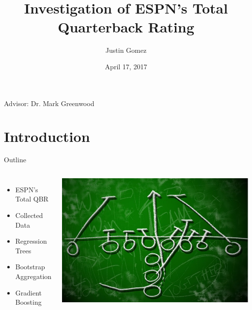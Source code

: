 \documentclass{beamer}
\title[ESPN's Total QBR]{Investigation of ESPN's Total Quarterback Rating}
\author{Justin Gomez}
\institute{Montana State University}
\date{April 17, 2017}
\begin{document}
	
	\begin{frame}
		\titlepage
		\centering
		\small
		Advisor: Dr. Mark Greenwood
	\end{frame}
	
	
	\section{Introduction}
	
	\begin{frame}{Outline}
		\begin{columns}
			\begin{itemize}
				\item ESPN's Total QBR
				\item Collected Data
				\item Regression Trees
				\item Bootstrap Aggregation
				\item Gradient Boosting
			\end{itemize}
			\includegraphics[scale=.2]{football-strategy.jpg}
		\end{columns}
	\end{frame}
	
\end{document}
